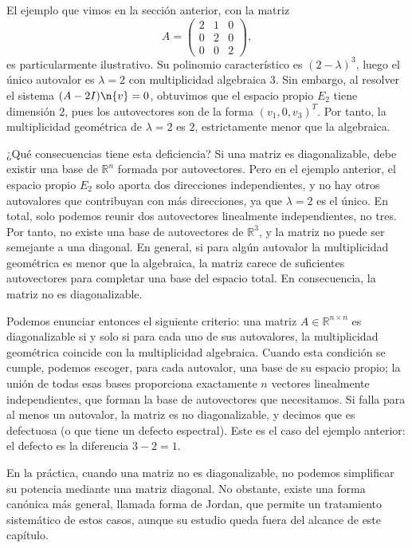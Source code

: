 El ejemplo que vimos en la sección anterior, con la matriz
\[
A = \begin{pmatrix} 2 & 1 & 0 \\ 0 & 2 & 0 \\ 0 & 0 & 2 \end{pmatrix},
\]
es particularmente ilustrativo. Su polinomio característico es $(2-\lambda)^3$, luego el único autovalor es $\lambda=2$ con multiplicidad algebraica $3$. Sin embargo, al resolver el sistema $(A-2I)\n{v}=0$, obtuvimos que el espacio propio $E_2$ tiene dimensión $2$, pues los autovectores son de la forma $(v_1,0,v_3)^T$. Por tanto, la multiplicidad geométrica de $\lambda=2$ es $2$, estrictamente menor que la algebraica.

¿Qué consecuencias tiene esta deficiencia? Si una matriz es diagonalizable, debe existir una base de $\mathbb{R}^n$ formada por autovectores. Pero en el ejemplo anterior, el espacio propio $E_2$ solo aporta dos direcciones independientes, y no hay otros autovalores que contribuyan con más direcciones, ya que $\lambda=2$ es el único. En total, solo podemos reunir dos autovectores linealmente independientes, no tres. Por tanto, no existe una base de autovectores de $\mathbb{R}^3$, y la matriz no puede ser semejante a una diagonal. En general, si para algún autovalor la multiplicidad geométrica es menor que la algebraica, la matriz carece de suficientes autovectores para completar una base del espacio total. En consecuencia, la matriz no es diagonalizable.

Podemos enunciar entonces el siguiente criterio: una matriz $A \in \mathbb{R}^{n\times n}$ es diagonalizable si y solo si para cada uno de sus autovalores, la multiplicidad geométrica coincide con la multiplicidad algebraica. Cuando esta condición se cumple, podemos escoger, para cada autovalor, una base de su espacio propio; la unión de todas esas bases proporciona exactamente $n$ vectores linealmente independientes, que forman la base de autovectores que necesitamos. Si falla para al menos un autovalor, la matriz es no diagonalizable, y decimos que es defectuosa (o que tiene un defecto espectral). Este es el caso del ejemplo anterior: el defecto es la diferencia $3-2=1$.

En la práctica, cuando una matriz no es diagonalizable, no podemos simplificar su potencia
mediante una matriz diagonal. No obstante, existe una forma canónica más general, llamada
forma de Jordan, que permite un tratamiento sistemático de estos casos, aunque su estudio
queda fuera del alcance de este capítulo.


